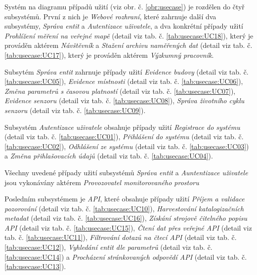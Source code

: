 Systém na diagramu případů užití (viz obr. č. \ref{obr:usecase}) je rozdělen do čtyř subsystémů.
První z nich je \textit{Webové rozhraní}, které zahrnuje další dva subsystémy, \textit{Správa entit} a \textit{Autentizace uživatele}, a dva konkrétní případy užití \textit{Prohlížení měření na veřejné mapě} (detail viz tab. č. \ref{tab:usecase:UC18}), který je prováděn aktérem \textit{Návštěvník} a \textit{Stažení archivu naměřených dat} (detail viz tab. č. \ref{tab:usecase:UC17}), který je prováděn aktérem \textit{Výzkumný pracovník}. 

Subsytém \textit{Správa entit} zahrnuje případy užití \textit{Evidence budovy} (detail viz tab. č. \ref{tab:usecase:UC05}), \textit{Evidence místnosti} (detail viz tab. č. \ref{tab:usecase:UC06}), \textit{Změna parametrů s časovou platností} (detail viz tab. č. \ref{tab:usecase:UC07}), \textit{Evidence senzoru} (detail viz tab. č. \ref{tab:usecase:UC08}), \textit{Správa životního cyklu senzoru} (detail viz tab. č. \ref{tab:usecase:UC09}). 

Subsystém \textit{Autentizace uživatele} obsahuje případy užití 
\textit{Registrace do systému} (detail viz tab. č. \ref{tab:usecase:UC01}), 
\textit{Přihlášení do systému} (detail viz tab. č. \ref{tab:usecase:UC02}), 
\textit{Odhlášení ze systému} (detail viz tab. č. \ref{tab:usecase:UC03}) a 
\textit{Změna přihlašovacích údajů} (detail viz tab. č. \ref{tab:usecase:UC04}).

Všechny uvedené případy užití subsystémů \textit{Správa entit} a \textit{Auntentizace uživatele} jsou vykonávány aktérem \textit{Provozovatel monitorovaného prostoru}

Posledním subsystémem je \textit{API}, které obsahuje případy užití 
\textit{Příjem a validace pozorování} (detail viz tab. č. \ref{tab:usecase:UC10}), 
\textit{Harvestování katalogizačních metadat} (detail viz tab. č. \ref{tab:usecase:UC16}), 
\textit{Získání strojově čitelného popisu API} (detail viz tab. č. \ref{tab:usecase:UC15}), 
\textit{Čtení dat přes veřejné API} (detail viz tab. č. \ref{tab:usecase:UC11}), 
\textit{Filtrování dotazů na čtecí API} (detail viz tab. č. \ref{tab:usecase:UC12}), 
\textit{Vyhledání entit dle parametrů} (detail viz tab. č. \ref{tab:usecase:UC14}) a 
\textit{Procházení stránkovaných odpovědí API} (detail viz tab. č. \ref{tab:usecase:UC13}).
